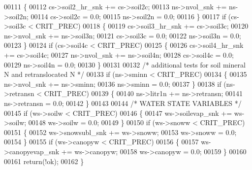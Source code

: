 \begin{DoxyCode}
00111     \{
00112         cs->soil2\_hr\_snk += cs->soil2c;
00113         ns->nvol\_snk += ns->soil2n;
00114         cs->soil2c = 0.0;
00115         ns->soil2n = 0.0;
00116     \}
00117     \textcolor{keywordflow}{if} (cs->soil3c < CRIT\_PREC)
00118     \{
00119         cs->soil3\_hr\_snk += cs->soil3c;
00120         ns->nvol\_snk += ns->soil3n;
00121         cs->soil3c = 0.0;
00122         ns->soil3n = 0.0;
00123     \}
00124     \textcolor{keywordflow}{if} (cs->soil4c < CRIT\_PREC)
00125     \{
00126         cs->soil4\_hr\_snk += cs->soil4c;
00127         ns->nvol\_snk += ns->soil4n;
00128         cs->soil4c = 0.0;
00129         ns->soil4n = 0.0;
00130     \}
00131     
00132     \textcolor{comment}{/* additional tests for soil mineral N and retranslocated N */}
00133     \textcolor{keywordflow}{if} (ns->sminn < CRIT\_PREC)
00134     \{
00135         ns->nvol\_snk += ns->sminn;
00136         ns->sminn = 0.0;
00137     \}
00138     \textcolor{keywordflow}{if} (ns->retransn < CRIT\_PREC)
00139     \{
00140         ns->litr1n += ns->retransn;
00141         ns->retransn = 0.0;
00142     \}
00143     
00144     \textcolor{comment}{/* WATER STATE VARIABLES */}
00145     \textcolor{keywordflow}{if} (ws->soilw < CRIT\_PREC)
00146     \{
00147         ws->soilevap\_snk += ws->soilw;
00148         ws->soilw = 0.0;
00149     \}
00150     \textcolor{keywordflow}{if} (ws->snoww < CRIT\_PREC)
00151     \{
00152         ws->snowsubl\_snk += ws->snoww;
00153         ws->snoww = 0.0;
00154     \}
00155     \textcolor{keywordflow}{if} (ws->canopyw < CRIT\_PREC)
00156     \{
00157         ws->canopyevap\_snk += ws->canopyw;
00158         ws->canopyw = 0.0;
00159     \}
00160     
00161     \textcolor{keywordflow}{return}(!ok);
00162 \}   
\end{DoxyCode}
